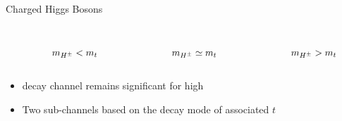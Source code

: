 \documentclass[aspectratio=169,xcolor=table]{beamer}
\begin{document}
\begin{frame}[t]{Charged Higgs Bosons}
\begin{columns}
\begin{itemize}
\begin{columns}
\begin{figure}
              \caption{$m_{H^{\pm}} < m_{t}$}
            \end{figure}
            \begin{figure}
              \tiny
              \caption{$m_{H^{\pm}} \simeq m_{t}$}
            \end{figure}
            \begin{figure}
              \tiny
              \caption{$m_{H^{\pm}} > m_{t}$}
            \end{figure}
        \end{columns}
        \item \HpmLong decay channel remains significant for high \tanb
        \item Two sub-channels based on the decay mode of associated $t$ 

\end{itemize}
\end{columns}
\end{frame}
\end{document}
